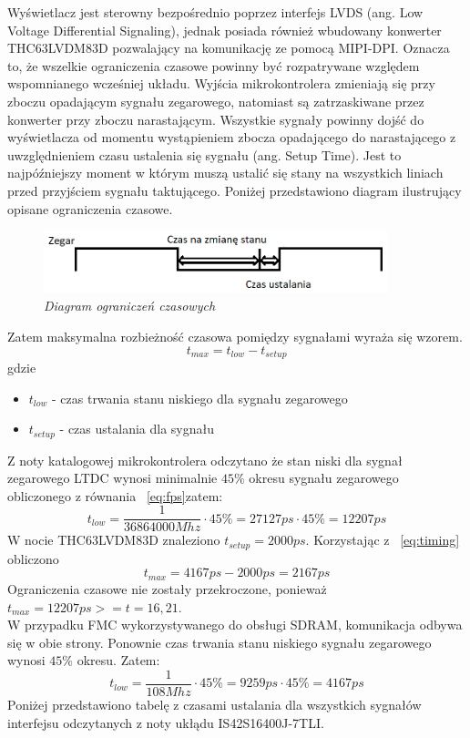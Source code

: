 \documentclass[eng,printmode]{mgr}
\begin{document}
Wyświetlacz jest sterowny bezpośrednio poprzez interfejs LVDS (ang. Low Voltage Differential Signaling), jednak  posiada również wbudowany konwerter THC63LVDM83D pozwalający na komunikację ze pomocą MIPI-DPI. Oznacza to, że wszelkie ograniczenia czasowe powinny być rozpatrywane względem wspomnianego wcześniej układu. Wyjścia
mikrokontrolera zmieniają się przy zboczu opadającym sygnału zegarowego, natomiast są zatrzaskiwane przez konwerter przy zboczu narastającym. Wszystkie sygnały powinny dojść do wyświetlacza od momentu wystąpieniem zbocza opadającego do narastającego z uwzględnieniem czasu ustalenia się sygnału (ang. Setup Time). Jest to najpóźniejszy moment w którym muszą ustalić się stany na wszystkich liniach przed przyjściem sygnału taktującego. Poniżej przedstawiono diagram ilustrujący opisane ograniczenia czasowe.

\begin{figure}[!h]
    \centering
    \includegraphics[width=10cm]{plots/timing.png}
    \caption{\textit{\scriptsize Diagram ograniczeń czasowych}}
\end{figure}

Zatem maksymalna rozbieżność czasowa pomiędzy sygnałami wyraża się wzorem.
\begin{equation}
t_{max} = t_{low}- t_{setup} \label{eq:timing}
\end{equation}
gdzie
\begin{itemize}
  \item \textbf{$t_{low}$} - czas trwania stanu niskiego dla sygnału zegarowego
  \item \textbf{$t_{setup}$} - czas ustalania dla sygnału
\end{itemize}

Z noty katalogowej mikrokontrolera odczytano że stan niski dla sygnał zegarowego LTDC wynosi minimalnie $45\%$
okresu sygnału zegarowego obliczonego z równania ~\ref{eq:fps}zatem:
$$
t_{low} = \frac{1}{36864000Mhz} \cdot 45\% = 27127ps\cdot45\% = 12207ps
$$
W nocie THC63LVDM83D znaleziono $t_{setup} = 2000ps$. Korzystając z ~\ref{eq:timing} obliczono
$$
t_{max} = 4167ps - 2000ps = 2167ps
$$
Ograniczenia czasowe nie zostały przekroczone, ponieważ $t_{max}= 12207ps >= t=16,21$.\\

W przypadku FMC wykorzystywanego do obsługi SDRAM, komunikacja odbywa się w obie strony. Ponownie czas trwania stanu niskiego sygnału zegarowego wynosi $45\%$ okresu. Zatem:
$$
t_{low} = \frac{1}{108Mhz} \cdot 45\% = 9259ps\cdot45\% = 4167ps
$$
 Poniżej przedstawiono tabelę z czasami ustalania dla wszystkich sygnałów interfejsu odczytanych z noty ukłądu IS42S16400J-7TLI.
\end{document}
